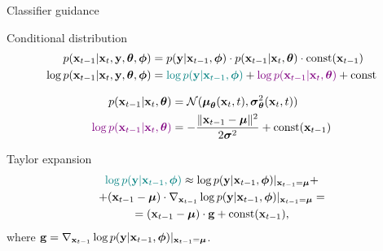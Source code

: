\documentclass{beamer}
\begin{document}
\begin{frame}{Classifier guidance}
	\begin{block}{Conditional distribution}
		\vspace{-0.5cm}
		\begin{align*}
			p(\mathbf{x}_{t - 1} | \mathbf{x}_t, \mathbf{y}, \boldsymbol{\theta} , \boldsymbol{\phi}) &= p(\mathbf{y} | \mathbf{x}_{t-1}, \boldsymbol{\phi}) \cdot p(\mathbf{x}_{t-1} | \mathbf{x}_t, \boldsymbol{\theta}) \cdot \text{const}(\mathbf{x}_{t - 1}) \\
			\log p(\mathbf{x}_{t - 1} | \mathbf{x}_t, \mathbf{y}, \boldsymbol{\theta} , \boldsymbol{\phi}) &= {\color{teal}\log p(\mathbf{y} | \mathbf{x}_{t-1}, \boldsymbol{\phi})} + {\color{violet}\log p(\mathbf{x}_{t-1} | \mathbf{x}_t, \boldsymbol{\theta})} + \text{const}
		\end{align*}
	\end{block}
	\vspace{-0.7cm}
	\begin{align*}
		p(\mathbf{x}_{t-1} | \mathbf{x}_t, \boldsymbol{\theta}) &= \mathcal{N}(\boldsymbol{\mu}_{\boldsymbol{\theta}}(\mathbf{x}_t, t), \boldsymbol{\sigma}^2_{\boldsymbol{\theta}}(\mathbf{x}_t, t)) \\
		{\color{violet}\log p(\mathbf{x}_{t-1} | \mathbf{x}_t, \boldsymbol{\theta})} &= - \frac{\|\mathbf{x}_{t - 1} - \boldsymbol{\mu}\|^2}{2 \boldsymbol{\sigma}^2} + \text{const}(\mathbf{x}_{t-1})
	\end{align*}
	\vspace{-0.5cm}
	\begin{block}{Taylor expansion}
		\vspace{-0.7cm}
		\begin{multline*}
			{\color{teal}\log p(\mathbf{y}| \mathbf{x}_{t-1}, \boldsymbol{\phi})} \approx \log p(\mathbf{y} | \mathbf{x}_{t-1}, \boldsymbol{\phi}) |_{\mathbf{x}_{t-1} = \boldsymbol{\mu}} + \\
			+ (\mathbf{x}_{t-1} - \boldsymbol{\mu}) \cdot \nabla_{\mathbf{x}_{t-1}} \log p(\mathbf{y} | \mathbf{x}_{t-1}, \boldsymbol{\phi}) |_{\mathbf{x}_{t-1} = \boldsymbol{\mu}} = \\
			= (\mathbf{x}_{t-1} - \boldsymbol{\mu}) \cdot \mathbf{g} +  \text{const}(\mathbf{x}_{t-1}),
		\end{multline*}
		where $\mathbf{g} =  \nabla_{\mathbf{x}_{t-1}} \log p(\mathbf{y} | \mathbf{x}_{t-1}, \boldsymbol{\phi}) |_{\mathbf{x}_{t-1} = \boldsymbol{\mu}}$.
	\end{block}
\end{frame}
\end{document}
